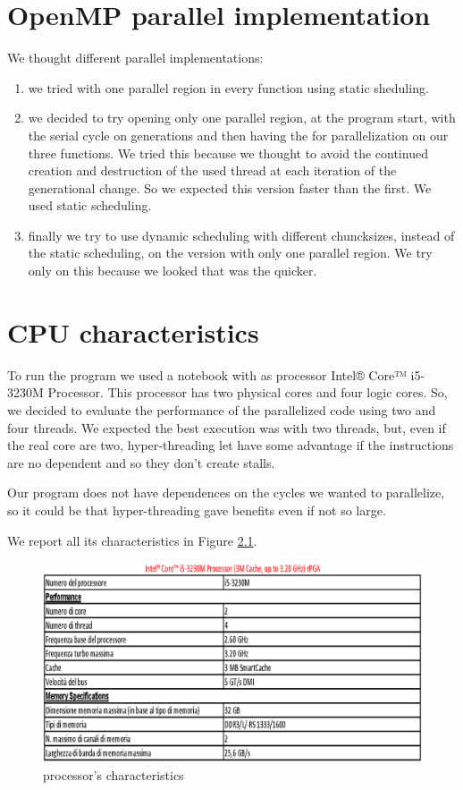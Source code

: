 \documentclass[a4paper,11pt,twoside]{report}
\begin{document}
\chapter{OpenMP parallel implementation}
We thought different parallel implementations:
\begin{enumerate}
\item we tried with one parallel region in every function using static sheduling.
	\item we decided to try opening only one parallel region, at the program start, with the serial cycle on generations and then having the for parallelization on our three functions. We tried this because we thought to avoid the continued creation and destruction of the used thread at each iteration of the generational change. So we expected this version faster than the first. We used static scheduling.
	\item finally we try to use dynamic scheduling with different chuncksizes, instead of the static scheduling, on the version with only one parallel region. We try only on this because we looked that was the quicker.
\end{enumerate}



\chapter{CPU characteristics}
To run the program we used a notebook with as processor Intel® Core™ i5-3230M Processor.
This processor has two physical cores and four logic cores. So, we decided to evaluate the performance of the parallelized code using two and four threads. We expected the best execution was with two threads, but, even if the real core are two, hyper-threading let have some advantage if the instructions are no dependent and so they don't create stalls.

\noindent Our program does not have dependences on the cycles we wanted to parallelize, so it could be that hyper-threading gave benefits even if not so large.

\noindent We report all its characteristics in Figure \ref{fig:2}.

\begin{figure}
	\centering
	\includegraphics[scale = 0.5]{i5.eps}
	\caption{processor's characteristics} \label{fig:2}
\end{figure}
\end{document}
